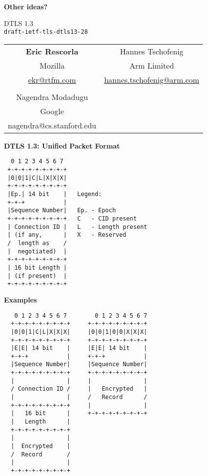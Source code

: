 \documentclass[helvetica]{seminar}
\newcommand{\heading}[1]{%
  \begin{center} 
    \large\bf 
    #1 
  \end{center} 
  \vspace{.4 in}}
\begin{document}
\begin{slide}
  \heading{Other ideas?}
\end{slide}

\begin{slide}
\begin{center}
\vspace{.5 in}
\LARGE{{\bf}DTLS 1.3\\{\small \verb^draft-ietf-tls-dtls13-28^}}\\
\vspace{.2in}
{\small
\begin{tabular}{c c}
\textbf{Eric Rescorla} & Hannes Tschofenig \\
Mozilla& Arm Limited \\ 
  \url{ekr@rtfm.com} & \url{hannes.tschofenig@arm.com} \\
  \\
  Nagendra Modadugu \\
  Google \\
  nagendra@cs.stanford.edu \\
  \end{tabular}

}

\end{center}
\end{slide}

\centerslidesfalse 

\begin{slide}
\heading{DTLS 1.3: Unified Packet Format}

{\scriptsize
\begin{verbatim}
  0 1 2 3 4 5 6 7
 +-+-+-+-+-+-+-+-+
 |0|0|1|C|L|X|X|X|
 +-+-+-+-+-+-+-+-+
 |Ep.| 14 bit    |   Legend:
 +-+-+           |
 |Sequence Number|   Ep. - Epoch
 +-+-+-+-+-+-+-+-+   C   - CID present
 | Connection ID |   L   - Length present
 | (if any,      |   X   - Reserved
 /  length as    /
 |  negotiated)  |
 +-+-+-+-+-+-+-+-+
 | 16 bit Length |
 | (if present)  |
 +-+-+-+-+-+-+-+-+
\end{verbatim}
}
\end{slide}

\begin{slide}
\heading{Examples}

\vspace{-.3in}
{\scriptsize
\begin{verbatim}
   0 1 2 3 4 5 6 7        0 1 2 3 4 5 6 7
  +-+-+-+-+-+-+-+-+     +-+-+-+-+-+-+-+-+
  |0|0|1|C|L|X|X|X|     |0|0|1|0|0|X|X|X|
  +-+-+-+-+-+-+-+-+     +-+-+-+-+-+-+-+-+
  |E|E| 14 bit    |     |E|E| 14 bit    |
  +-+-+           |     +-+-+           |
  |Sequence Number|     |Sequence Number|
  +-+-+-+-+-+-+-+-+     +-+-+-+-+-+-+-+-+
  |               |     |               |
  / Connection ID /     |   Encrypted   |
  |               |     /   Record      /
  +-+-+-+-+-+-+-+-+     |               |
  |   16 bit      |     +-+-+-+-+-+-+-+-+
  |   Length      |
  +-+-+-+-+-+-+-+-+
  |               |
  |  Encrypted    |
  /  Record       /
  |               |
  +-+-+-+-+-+-+-+-+
\end{verbatim}
  }
\end{slide}
\end{document}
